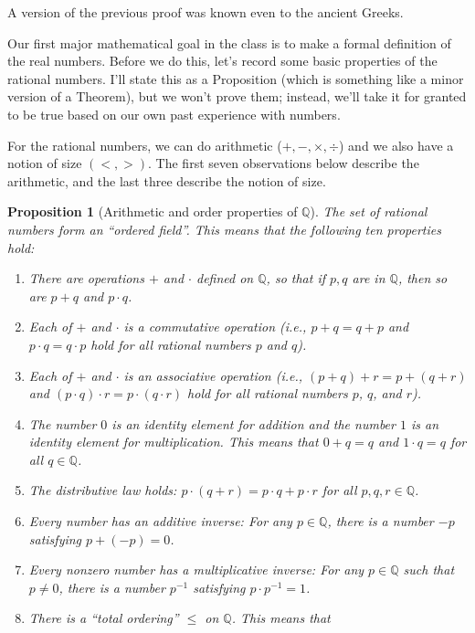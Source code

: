 \documentclass[12pt]{amsart}
\newcommand{\Q}{\mathbb{Q}}
\numberwithin{equation}{section}
\theoremstyle{plain} %
\newtheorem{prop}[equation]{Proposition}
\theoremstyle{definition}
\theoremstyle{remark}
\begin{document}
A version of the previous proof was known even to the ancient Greeks.




Our first major mathematical goal in the class is to make a formal definition of the real numbers. 
Before we do this, let's record some basic properties of the rational numbers. I'll state this as a Proposition (which is something like a minor version of a Theorem), but we won't prove them; instead, we'll take it for granted to be true based on our own past experience with numbers.

For the rational numbers, we can do arithmetic ($+,-,\times,\div$) and we also have a notion of size $(<,>)$. The first seven observations below describe the arithmetic, and the last three describe the notion of size.


\begin{prop}[Arithmetic and order properties of $\Q$]\label{prop1}
  The set of rational numbers form an ``ordered field''.\label{ordered field} This means that the following ten properties hold:
\begin{enumerate}
\item There are operations $+$ and $\cdot$ defined on $\Q$, so that if $p, q$ are in $\Q$, then so are $p + q$ and $p \cdot q$.
\item Each of $+$ and $\cdot$ is a commutative operation (i.e., $p + q = q + p$ and $p \cdot q = q \cdot p$ hold for all rational numbers $p$ and $q$). 
\item Each of $+$ and $\cdot$ is an associative  operation (i.e., $(p + q) + r = p + (q + r)$ and $(p \cdot q) \cdot r = p \cdot (q \cdot r)$ hold for all rational numbers $p$,
  $q$, and $r$). 
\item The number $0$ is an identity element for addition and the number $1$ is an identity element for multiplication. This means that
 $0 + q = q$ and $1 \cdot q = q$ for all $q \in \Q$. 
\item The distributive law holds: $p \cdot (q + r) = p \cdot q + p \cdot r$ for all $p,q,r \in \Q$. 
\item Every number has an additive inverse: For any $p \in \Q$, there is a number $-p$ satisfying $p + (-p) = 0$.
\item Every nonzero number has a multiplicative inverse: For any $p \in \Q$ such that $p \ne 0$, there is a number $p^{-1}$ satisfying ${p \cdot p^{-1}= 1}$.
\item There is a ``total ordering'' $\leq$ on $\Q$. This means that 
\begin{enumerate}

\end{enumerate}
\end{enumerate}
\end{prop}
\end{document}
